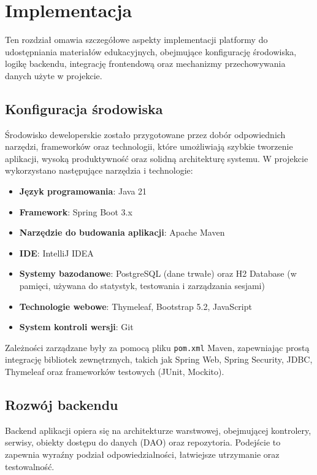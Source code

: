 \chapter{Implementacja}

Ten rozdział omawia szczegółowe aspekty implementacji platformy do udostępniania materiałów edukacyjnych, obejmujące konfigurację środowiska, logikę backendu, integrację frontendową oraz mechanizmy przechowywania danych użyte w projekcie.

\section{Konfiguracja środowiska}

Środowisko deweloperskie zostało przygotowane przez dobór odpowiednich narzędzi, frameworków oraz technologii, które umożliwiają szybkie tworzenie aplikacji, wysoką produktywność oraz solidną architekturę systemu. W projekcie wykorzystano następujące narzędzia i technologie:

\begin{itemize}
\item \textbf{Język programowania}: Java 21
\item \textbf{Framework}: Spring Boot 3.x
\item \textbf{Narzędzie do budowania aplikacji}: Apache Maven
\item \textbf{IDE}: IntelliJ IDEA
\item \textbf{Systemy bazodanowe}: PostgreSQL (dane trwałe) oraz H2 Database (w pamięci, używana do statystyk, testowania i zarządzania sesjami)
\item \textbf{Technologie webowe}: Thymeleaf, Bootstrap 5.2, JavaScript
\item \textbf{System kontroli wersji}: Git
\end{itemize}

Zależności zarządzane były za pomocą pliku \texttt{pom.xml} Maven, zapewniając prostą integrację bibliotek zewnętrznych, takich jak Spring Web, Spring Security, JDBC, Thymeleaf oraz frameworków testowych (JUnit, Mockito).

\section{Rozwój backendu}

Backend aplikacji opiera się na architekturze warstwowej, obejmującej kontrolery, serwisy, obiekty dostępu do danych (DAO) oraz repozytoria. Podejście to zapewnia wyraźny podział odpowiedzialności, łatwiejsze utrzymanie oraz testowalność.


